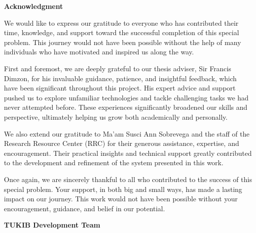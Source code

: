 \begin{center}
	\textbf{Acknowledgment}
\end{center}

We would like to express our gratitude to everyone who has contributed their time, knowledge, and support toward the successful completion of this special problem. This journey would not have been possible without the help of many individuals who have motivated and inspired us along the way.

First and foremost, we are deeply grateful to our thesis adviser, Sir Francis Dimzon, for his invaluable guidance, patience, and insightful feedback, which have been significant throughout this project. His expert advice and support pushed us to explore unfamiliar technologies and tackle challenging tasks we had never attempted before. These experiences significantly broadened our skills and perspective, ultimately helping us grow both academically and personally.

We also extend our gratitude to Ma’am Susci Ann Sobrevega and the staff of the Research Resource Center (RRC) for their generous assistance, expertise, and encouragement. Their practical insights and technical support greatly contributed to the development and refinement of the system presented in this work.

Once again, we are sincerely thankful to all who contributed to the success of this special problem. Your support, in both big and small ways, has made a lasting impact on our journey. This work would not have been possible without your encouragement, guidance, and belief in our potential.

\vspace{0.5em}
\hfill \textbf{TUKIB Development Team}




